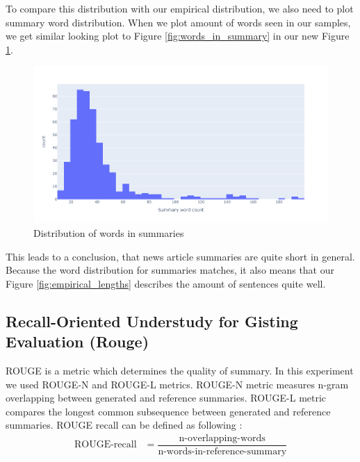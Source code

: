 \documentclass{article}
\begin{document}
\noindent
To compare this distribution with our empirical distribution, we also need to plot summary word distribution. When we plot amount of words seen in our samples, we get similar looking plot to Figure \ref{fig:words_in_summary} in our new Figure \ref{fig:empirical_summary_words}.\\

\noindent
\begin{figure}[H]
	\centering
	\includegraphics[scale=0.4]{empirical_summary_words.png}
	\caption{Distribution of words in summaries}
	\label{fig:empirical_summary_words}
\end{figure}

\noindent
This leads to a conclusion, that news article summaries are quite short in general. Because the word distribution for summaries matches, it also means that our Figure \ref{fig:empirical_lengths} describes the amount of sentences quite well.\\

\subsection{Recall-Oriented Understudy for Gisting Evaluation (Rouge)}

ROUGE is a metric which determines the quality of summary. In this experiment we used ROUGE-N and ROUGE-L metrics. ROUGE-N metric measures n-gram overlapping between generated and reference summaries. ROUGE-L metric compares the longest common subsequence between generated and reference summaries. ROUGE recall can be defined as following \cite{rouge}: \\

\begin{align*}
	\text{ROUGE-recall} &= \dfrac{\text{n-overlapping-words}}{\text{n-words-in-reference-summary}}
\end{align*}\\
\end{document}
